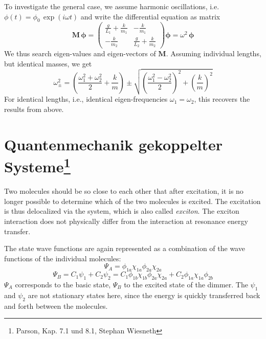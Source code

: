 To investigate the general case, we assume harmonic oscillations, i.e. $\phi(t) = \phi_0 \, \exp (i \omega t)$ and write the differential equation as matrix
\[ \boldsymbol{M \, \phi}	 = 
\begin{pmatrix}
  \frac{g}{L_1} +  \frac{k}{m_1}&  - \frac{k}{m_1}\\
 - \frac{k}{m_2} &  \frac{g}{L_2} +  \frac{k}{m_2}
\end{pmatrix}  \boldsymbol{\phi}	= \omega^2   \, \boldsymbol{\phi}
\]
We thus search eigen-values and eigen-vectors of  $\boldsymbol{M}$. Assuming individual lengths, but identical masses, we get
\[
 \omega_{\pm}^2 = \left( \frac{\omega_1^2 + \omega_2^2}{2}  + \frac{k}{m} \right)
  \pm \sqrt{  \left( \frac{\omega_1^2 - \omega_2^2}{2}   \right)^2 + \left(  \frac{k}{m} \right)^2 }
\]
For identical lengths, i.e., identical eigen-frequencies $\omega_1 = \omega_2$, this recovers the results from above.


%

\section{Quantenmechanik gekoppelter Systeme\protect\footnote{Parson, Kap. 7.1 und 8.1, Stephan Wiesneth}} 



Two molecules should be so close to each other that after excitation, it is no longer possible to determine which of the two molecules is excited. The excitation is thus delocalized via the system, which is also called \textit{exciton}. The exciton interaction does not physically differ from the interaction at resonance energy transfer.

The state wave functions are again represented as a combination of the wave functions of the individual molecules:
\[ \Psi_A = \phi_{1a}\chi_{1a}\phi_{2a}\chi_{2a} \]
\[ \Psi_B = C_1\psi_1 + C_2\psi_2 = C_1\phi_{1b}\chi_{1b}\phi_{2a}\chi_{2a} + C_2\phi_{1a}\chi_{1a}\phi_{2b} \] 
$\Psi_A$ corresponds to the basic state, $\Psi_B$ to the excited state of the dimmer. The $\psi_1$ and $\psi_2$ are not stationary states here, since the energy is quickly transferred back and forth between the molecules.

